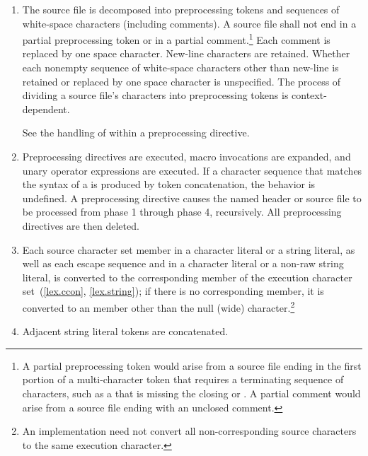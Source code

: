 \begin{enumerate}
\item The source file is decomposed into preprocessing
tokens and sequences of white-space characters
(including comments). A source file shall not end in a partial
preprocessing token or in a partial comment.\footnote{A partial preprocessing
token would arise from a source file
ending in the first portion of a multi-character token that requires a
terminating sequence of characters, such as a 
that is missing the closing 
or \tcode{>}. A partial comment
would arise from a source file ending with an unclosed \tcode{/*}
comment.}
Each comment is replaced by one space character. New-line characters are
retained. Whether each nonempty sequence of white-space characters other
than new-line is retained or replaced by one space character is
unspecified. The process of dividing a source file's
characters into preprocessing tokens is context-dependent.
\begin{example}
See the handling of \tcode{<} within a  preprocessing
directive.
\end{example}

\item Preprocessing directives are executed, macro invocations are
expanded, and  unary operator expressions are executed.
If a character sequence that matches the syntax of a
 is produced by token
concatenation, the behavior is undefined. A
 preprocessing directive causes the named header or
source file to be processed from phase 1 through phase 4, recursively.
All preprocessing directives are then deleted.

\item Each source character set member in a character literal or a string
literal, as well as each escape sequence and  in a
character literal or a non-raw string literal, is converted to the corresponding
member of the execution character set~(\ref{lex.ccon}, \ref{lex.string}); if
there is no corresponding member, it is converted to an  member other
than the null (wide) character.\footnote{An implementation need not convert all
non-corresponding source characters to the same execution character.}

\item Adjacent string literal tokens are concatenated.


\end{enumerate}
